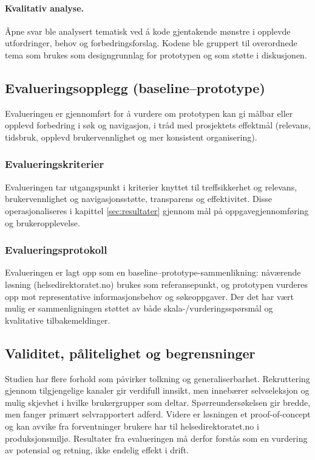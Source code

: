 \paragraph{Kvalitativ analyse.}
\label{sec:kval}
Åpne svar ble analysert tematisk ved å kode gjentakende mønstre i opplevde utfordringer, behov og forbedringsforslag. Kodene ble gruppert til overordnede tema som brukes som designgrunnlag for prototypen og som støtte i diskusjonen.

\subsection{Evalueringsopplegg (baseline--prototype)}
\label{sec:evaluering}

Evalueringen er gjennomført for å vurdere om prototypen kan gi målbar eller opplevd forbedring i søk og navigasjon, i tråd med prosjektets effektmål (relevans, tidsbruk, opplevd brukervennlighet og mer konsistent organisering). \cite{ProjectPlan}

\subsubsection{Evalueringskriterier}
\label{sec:kriterier}

Evalueringen tar utgangspunkt i kriterier knyttet til treffsikkerhet og relevans, brukervennlighet og navigasjonsstøtte, transparens og effektivitet. Disse operasjonaliseres i kapittel \ref{sec:resultater} gjennom mål på oppgavegjennomføring og brukeropplevelse.

\subsubsection{Evalueringsprotokoll}
\label{sec:opplegg}

Evalueringen er lagt opp som en baseline--prototype-sammenlikning: nåværende løsning (helsedirektoratet.no) brukes som referansepunkt, og prototypen vurderes opp mot representative informasjonsbehov og søkeoppgaver. Der det har vært mulig er sammenligningen støttet av både skala-/vurderingsspørsmål og kvalitative tilbakemeldinger.

\subsection{Validitet, pålitelighet og begrensninger}
\label{sec:validitet}

Studien har flere forhold som påvirker tolkning og generaliserbarhet. Rekruttering gjennom tilgjengelige kanaler gir verdifull innsikt, men innebærer selvseleksjon og mulig skjevhet i hvilke brukergrupper som deltar. Spørreundersøkelsen gir bredde, men fanger primært selvrapportert adferd. Videre er løsningen et proof-of-concept og kan avvike fra forventninger brukere har til helsedirektoratet.no i produksjonsmiljø. Resultater fra evalueringen må derfor forstås som en vurdering av potensial og retning, ikke endelig effekt i drift. \cite{ProjectPlan}

